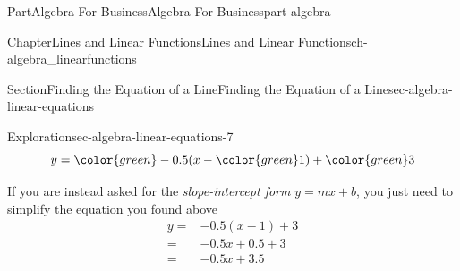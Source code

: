 \documentclass{tufte-book}
\numberwithin{equation}{chapter}
\newcommand{\amp}{&}
\begin{document}
\begin{partptx}{Part}{Algebra For Business}{}{Algebra For Business}{}{}{part-algebra}
\begin{chapterptx}{Chapter}{Lines and Linear Functions}{}{Lines and Linear Functions}{}{}{ch-algebra_linearfunctions}
\begin{sectionptx}{Section}{Finding the Equation of a Line}{}{Finding the Equation of a Line}{}{}{sec-algebra-linear-equations}
\begin{exploration}{Exploration}{}{sec-algebra-linear-equations-7}
\begin{equation*}
y = {\color{green} -0.5} (x - { \color{green} 1}) + {\color{green} 3}
\end{equation*}
%
\par
If you are instead asked for the \emph{slope-intercept form} \(y=mx+b\), you just need to simplify the equation you found above%
\begin{align*}
y = \amp {-0.5} (x - {1}) + {3} \\
= \amp -0.5 x + 0.5 + 3 \\
= \amp -0.5 x + 3.5 
\end{align*}
%
\begin{image}{0.25}{0.5}{0.25}{}%
\end{image}
\end{exploration}
\end{sectionptx}
\end{chapterptx}
\end{partptx}
\end{document}
